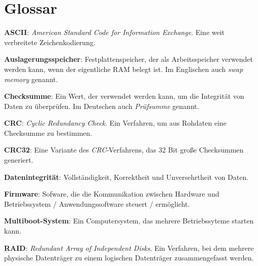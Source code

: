 \section{Glossar}

\textbf{ASCII}:
\textit{American Standard Code for Information Exchange}. Eine weit verbreitete Zeichenkodierung.

\textbf{Auslagerungsspeicher}:
Festplattenspeicher, der als Arbeitsspeicher verwendet werden kann, wenn der eigentliche RAM belegt ist.
Im Englischen auch \textit{swap memory} genannt.

\textbf{Checksumme}:
Ein Wert, der verwendet werden kann, um die Integrität von Daten zu überprüfen.
Im Deutschen auch \textit{Prüfsumme} genannt.

\textbf{CRC}:
\textit{Cyclic Redundancy Check}.
Ein Verfahren, um aus Rohdaten eine Checksumme zu bestimmen.

\textbf{CRC32}:
Eine Variante des \textit{CRC}-Verfahrens, das 32 Bit große Checksummen generiert.

\textbf{Datenintegrität}:
Vollständigkeit, Korrektheit und Unversehrtheit von Daten. 

\textbf{Firmware}:
Sofware, die die Kommunikation zwischen Hardware und Betriebssystem / Anwendungssoftware steuert / ermöglicht.

\textbf{Multiboot-System}:
Ein Computersystem, das mehrere Betriebssyteme starten kann.

\textbf{RAID}:
\textit{Redundant Array of Independent Disks}.
Ein Verfahren, bei dem mehrere physische Datenträger zu einem logischen Datenträger zusammengefasst werden.
